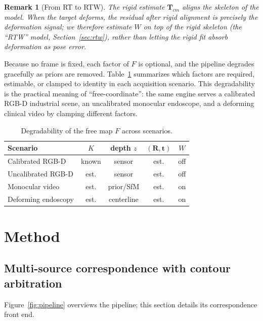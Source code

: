 \documentclass[9pt,twoside,web]{ieeecolor2}
\newtheorem{remark}{Remark}
\begin{document}
\begin{remark}[From RT to RTW]
The rigid estimate $\mathbf{T}_{cm}$ aligns the \emph{skeleton} of the model. When the target deforms, the residual after rigid alignment is precisely the deformation signal; we therefore estimate $W$ on top of the rigid skeleton (the ``RTW'' model, Section~\ref{sec:rtw}), rather than letting the rigid fit absorb deformation as pose error.
\end{remark}

Because no frame is fixed, each factor of $F$ is optional, and the pipeline degrades gracefully as priors are removed. Table~\ref{tab:degrade} summarizes which factors are required, estimable, or clamped to identity in each acquisition scenario. This degradability is the practical meaning of ``free-coordinate'': the same engine serves a calibrated RGB-D industrial scene, an uncalibrated monocular endoscope, and a deforming clinical video by clamping different factors.

\begin{table}[t]
\centering
\caption{Degradability of the free map $F$ across scenarios.}
\label{tab:degrade}
\begin{tabular}{lcccc}
\toprule
Scenario & $K$ & depth $z$ & $(\mathbf{R},\mathbf{t})$ & $W$ \\
\midrule
Calibrated RGB-D & known & sensor & est. & off \\
Uncalibrated RGB-D & est. & sensor & est. & off \\
Monocular video & est. & prior/SfM & est. & on \\
Deforming endoscopy & est. & centerline & est. & on \\
\bottomrule
\end{tabular}
\end{table}

\section{Method}\label{sec:method}

\subsection{Multi-source correspondence with contour arbitration}\label{sec:engine}
Figure~\ref{fig:pipeline} overviews the pipeline; this section details its correspondence front end.
\end{document}
